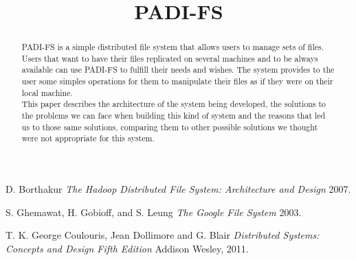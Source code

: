 \documentclass[times, 10pt,twocolumn]{article}
\begin{document}
\title{PADI-FS}

\maketitle
\thispagestyle{empty}

\begin{abstract}
   PADI-FS is a simple distributed file system that allows users to manage
   sets of files. Users that want to have their files replicated on several
   machines and to be always available can use PADI-FS to fulfill their
   needs and wishes. The system provides to the user some simples operations
   for them to manipulate their files as if they were on their local machine.\\

   This paper describes the architecture of the system being developed, the
   solutions to the problems we can face when building this kind of system
   and the reasons that led us to those same solutions, comparing them to
   other possible solutions we thought were not appropriate for this system.
\end{abstract}













\begin{thebibliography}{1}

   D. Borthakur {\em The Hadoop Distributed File System: Architecture and Design}  2007.

    S. Ghemawat, H. Gobioff, and S. Leung {\em The Google File System} 2003.

   T. K. George Coulouris, Jean Dollimore and G. Blair {\em Distributed Systems: Concepts and Design Fifth Edition} Addison Wesley, 2011.

\end{thebibliography}
\end{document}
